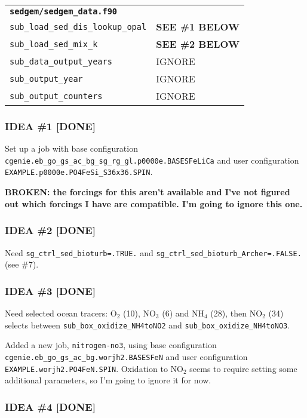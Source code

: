 \documentclass[a4paper,10pt,article]{memoir}
\begin{document}
\begin{tabular}{ll}
  \multicolumn{2}{l}{\textbf{\texttt{sedgem/sedgem\_data.f90}}} \\
  \texttt{sub\_load\_sed\_dis\_lookup\_opal} & \textbf{SEE \#1 BELOW} \\
  \texttt{sub\_load\_sed\_mix\_k}            & \textbf{SEE \#2 BELOW} \\
  \texttt{sub\_data\_output\_years}          & IGNORE \\
  \texttt{sub\_output\_year}                 & IGNORE \\
  \texttt{sub\_output\_counters}             & IGNORE
\end{tabular}

\subsubsection*{IDEA \#1 [DONE]}

Set up a job with base configuration
\texttt{cgenie.eb\_go\_gs\_ac\_bg\_sg\_rg\_gl.p0000e.BASESFeLiCa} and
user configuration \texttt{EXAMPLE.p0000e.PO4FeSi\_S36x36.SPIN}.

\textbf{BROKEN: the forcings for this aren't available and I've not
  figured out which forcings I have are compatible.  I'm going to
  ignore this one.}

\subsubsection*{IDEA \#2 [DONE]}

Need \texttt{sg\_ctrl\_sed\_bioturb=.TRUE.} and
\texttt{sg\_ctrl\_sed\_bioturb\_Archer=.FALSE.} (see \#7).

\subsubsection*{IDEA \#3 [DONE]}

Need selected ocean tracers: $\mathrm{O_2}$ (10), $\mathrm{NO_3}$ (6)
and $\mathrm{NH_4}$ (28), then $\mathrm{NO_2}$ (34) selects between
\texttt{sub\_box\_oxidize\_NH4toNO2} and
\texttt{sub\_box\_oxidize\_NH4toNO3}.

Added a new job, \texttt{nitrogen-no3}, using base configuration
\texttt{cgenie.eb\_go\_gs\_ac\_bg.worjh2.BASESFeN} and user
configuration \texttt{EXAMPLE.worjh2.PO4FeN.SPIN}.  Oxidation to
$\mathrm{NO_2}$ seems to require setting some additional parameters,
so I'm going to ignore it for now.

\subsubsection*{IDEA \#4 [DONE]}
\end{document}
